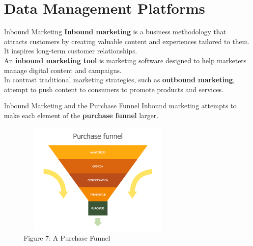 \documentclass[pdf]{beamer}
\newcommand{\empr}[1]{{\color{franklinblue}\textbf{#1}}}
\theoremstyle{remark}
\theoremstyle{definition}
\begin{document}
\section{Data Management Platforms}

\begin{frame}[t]{Inbound Marketing}
\empr{Inbound marketing} is a business methodology that attracts customers by creating valuable content and experiences tailored to them. It inspires long-term customer relationships.\\
\vspace{1.5ex}
An \empr{inbound marketing tool} is marketing software designed to help marketers manage digital content and campaigns.\\
\vspace{1.5ex}
In contrast traditional marketing strategies, such as \empr{outbound marketing}, attempt to push content to consumers to promote products and services.
\end{frame}

\begin{frame}[t]{Inbound Marketing and the Purchase Funnel}
Inbound marketing attempts to make each element of the \empr{purchase funnel} larger. \\
\vspace{1.5ex}
\begin{figure}[htbp]
  \captionsetup{justification=centering}
  \includegraphics[height=5.6cm, trim=0.0cm 0.0cm 0.0cm 5.0cm, clip, width=8cm]{Images/Purchase_Funnel.png}
  \caption{Figure {\color{franklinblue} 7}: A Purchase Funnel}
\end{figure}
\end{frame}
\end{document}
